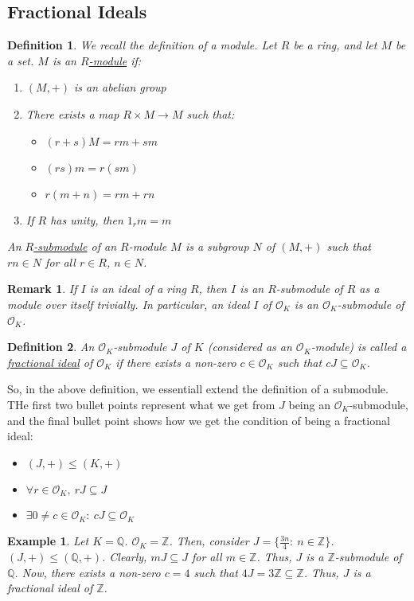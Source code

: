 \documentclass{article}
\newcommand{\air}{\mathcal{O}_K}
\newcommand{\Q}{\mathbb{Q}}
\newcommand{\Z}{\mathbb{Z}}
\newtheorem{remark}{Remark}[subsection]
\newtheorem{example}{Example}[subsection]
\newtheorem{definition}{Definition}[subsection]
\begin{document}
\subsection{Fractional Ideals}
\begin{definition}
We recall the definition of a module. Let $R$ be a ring, and let $M$ be a set. $M$ is an \underline{$R$-module} if:
\begin{enumerate}
    \item $(M,+)$ is an abelian group
    \item There exists a map $R\times M\rightarrow M$ such that:
    \begin{itemize}
        \item $(r+s)M=rm+sm$
        \item $(rs)m=r(sm)$
        \item $r(m+n)=rm+rn$
    \end{itemize}
    \item If $R$ has unity, then $1_rm=m$
\end{enumerate}
An \underline{$R$-submodule} of an $R$-module $M$ is a subgroup $N$ of $(M,+)$ such that $rn\in N$ for all $r\in R$, $n\in N$. 
\end{definition}
\begin{remark}
If $I$ is an ideal of a ring $R$, then $I$ is an $R$-submodule of $R$ as a module over itself trivially. In particular, an ideal $I$ of $\air$ is an $\air$-submodule of $\air$.
\end{remark}
\begin{definition}
An $\air$-submodule $J$ of $K$ (considered as an $\air$-module) is called a \underline{fractional ideal} of $\air$ if there exists a non-zero $c\in \air$ such that $cJ\subseteq \air$.
\end{definition}
\noindent So, in the above definition, we essentiall extend the definition of a submodule. THe first two bullet points represent what we get from $J$ being an $\air$-submodule, and the final bullet point shows how we get the condition of being a fractional ideal:
\begin{itemize}
    \item $(J,+) \leq (K,+)$
    \item $\forall r\in\air,\ rJ\subseteq J$
    \item $\exists 0\neq c\in\air :\ cJ\subseteq \air$
\end{itemize} 
\begin{example}
Let $K=\Q$. $\air = \Z$. Then, consider $J=\{\frac{3n}{4}:\ n\in\Z\}$. $(J,+)\leq (\Q,+)$. Clearly, $mJ\subseteq J$ for all $m\in\Z$. Thus, $J$ is a $\Z$-submodule of $\Q$. Now, there exists a non-zero $c=4$ such that $4J = 3\Z \subseteq \Z$. Thus, $J$ is a fractional ideal of $\Z$. 
\end{example}
\end{document}
